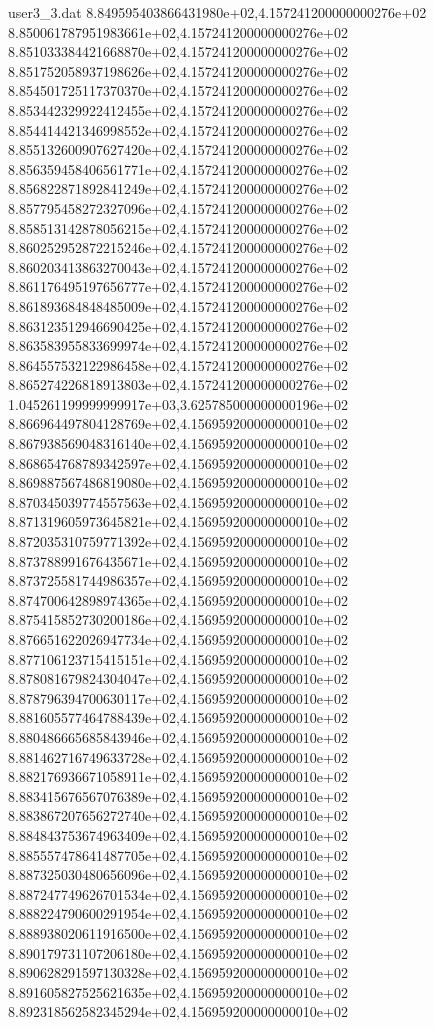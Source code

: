 \begin{filecontents}{user3_3.dat}
8.849595403866431980e+02,4.157241200000000276e+02
8.850061787951983661e+02,4.157241200000000276e+02
8.851033384421668870e+02,4.157241200000000276e+02
8.851752058937198626e+02,4.157241200000000276e+02
8.854501725117370370e+02,4.157241200000000276e+02
8.853442329922412455e+02,4.157241200000000276e+02
8.854414421346998552e+02,4.157241200000000276e+02
8.855132600907627420e+02,4.157241200000000276e+02
8.856359458406561771e+02,4.157241200000000276e+02
8.856822871892841249e+02,4.157241200000000276e+02
8.857795458272327096e+02,4.157241200000000276e+02
8.858513142878056215e+02,4.157241200000000276e+02
8.860252952872215246e+02,4.157241200000000276e+02
8.860203413863270043e+02,4.157241200000000276e+02
8.861176495197656777e+02,4.157241200000000276e+02
8.861893684848485009e+02,4.157241200000000276e+02
8.863123512946690425e+02,4.157241200000000276e+02
8.863583955833699974e+02,4.157241200000000276e+02
8.864557532122986458e+02,4.157241200000000276e+02
8.865274226818913803e+02,4.157241200000000276e+02
1.045261199999999917e+03,3.625785000000000196e+02
8.866964497804128769e+02,4.156959200000000010e+02
8.867938569048316140e+02,4.156959200000000010e+02
8.868654768789342597e+02,4.156959200000000010e+02
8.869887567486819080e+02,4.156959200000000010e+02
8.870345039774557563e+02,4.156959200000000010e+02
8.871319605973645821e+02,4.156959200000000010e+02
8.872035310759771392e+02,4.156959200000000010e+02
8.873788991676435671e+02,4.156959200000000010e+02
8.873725581744986357e+02,4.156959200000000010e+02
8.874700642898974365e+02,4.156959200000000010e+02
8.875415852730200186e+02,4.156959200000000010e+02
8.876651622026947734e+02,4.156959200000000010e+02
8.877106123715415151e+02,4.156959200000000010e+02
8.878081679824304047e+02,4.156959200000000010e+02
8.878796394700630117e+02,4.156959200000000010e+02
8.881605577464788439e+02,4.156959200000000010e+02
8.880486665685843946e+02,4.156959200000000010e+02
8.881462716749633728e+02,4.156959200000000010e+02
8.882176936671058911e+02,4.156959200000000010e+02
8.883415676567076389e+02,4.156959200000000010e+02
8.883867207656272740e+02,4.156959200000000010e+02
8.884843753674963409e+02,4.156959200000000010e+02
8.885557478641487705e+02,4.156959200000000010e+02
8.887325030480656096e+02,4.156959200000000010e+02
8.887247749626701534e+02,4.156959200000000010e+02
8.888224790600291954e+02,4.156959200000000010e+02
8.888938020611916500e+02,4.156959200000000010e+02
8.890179731107206180e+02,4.156959200000000010e+02
8.890628291597130328e+02,4.156959200000000010e+02
8.891605827525621635e+02,4.156959200000000010e+02
8.892318562582345294e+02,4.156959200000000010e+02

\end{filecontents}

